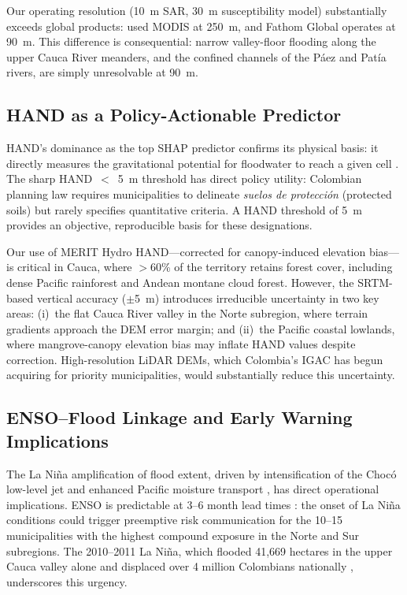 \documentclass{article}
\begin{document}
Our operating resolution (\SI{10}{\metre} SAR, \SI{30}{\metre} susceptibility model) substantially exceeds global products: \citet{Tellman2021} used MODIS at \SI{250}{\metre}, and Fathom Global operates at \SI{90}{\metre}. This difference is consequential: narrow valley-floor flooding along the upper Cauca River meanders, and the confined channels of the P\'aez and Pat\'ia rivers, are simply unresolvable at \SI{90}{\metre}.

\subsection{HAND as a Policy-Actionable Predictor}

HAND's dominance as the top SHAP predictor confirms its physical basis: it directly measures the gravitational potential for floodwater to reach a given cell \citep{Renno2008, Nobre2011}. The sharp HAND~$<$~\SI{5}{\metre} threshold has direct policy utility: Colombian planning law requires municipalities to delineate \textit{suelos de protecci\'on} (protected soils) but rarely specifies quantitative criteria. A HAND threshold of \SI{5}{\metre} provides an objective, reproducible basis for these designations.

Our use of MERIT Hydro HAND---corrected for canopy-induced elevation bias---is critical in Cauca, where $>$60\% of the territory retains forest cover, including dense Pacific rainforest and Andean montane cloud forest. However, the SRTM-based vertical accuracy ($\pm$\SI{5}{\metre}) introduces irreducible uncertainty in two key areas: (i)~the flat Cauca River valley in the Norte subregion, where terrain gradients approach the DEM error margin; and (ii)~the Pacific coastal lowlands, where mangrove-canopy elevation bias may inflate HAND values despite correction. High-resolution LiDAR DEMs, which Colombia's IGAC has begun acquiring for priority municipalities, would substantially reduce this uncertainty.

\subsection{ENSO--Flood Linkage and Early Warning Implications}

The La Ni\~na amplification of flood extent, driven by intensification of the Choc\'o low-level jet and enhanced Pacific moisture transport \citep{Poveda2001}, has direct operational implications. ENSO is predictable at 3--6 month lead times \citep{Tippett2012}: the onset of La Ni\~na conditions could trigger preemptive risk communication for the 10--15 municipalities with the highest compound exposure in the Norte and Sur subregions. The 2010--2011 La Ni\~na, which flooded 41,669 hectares in the upper Cauca valley alone \citep{Enciso2016} and displaced over 4 million Colombians nationally \citep{Hoyos2013}, underscores this urgency.
\end{document}

